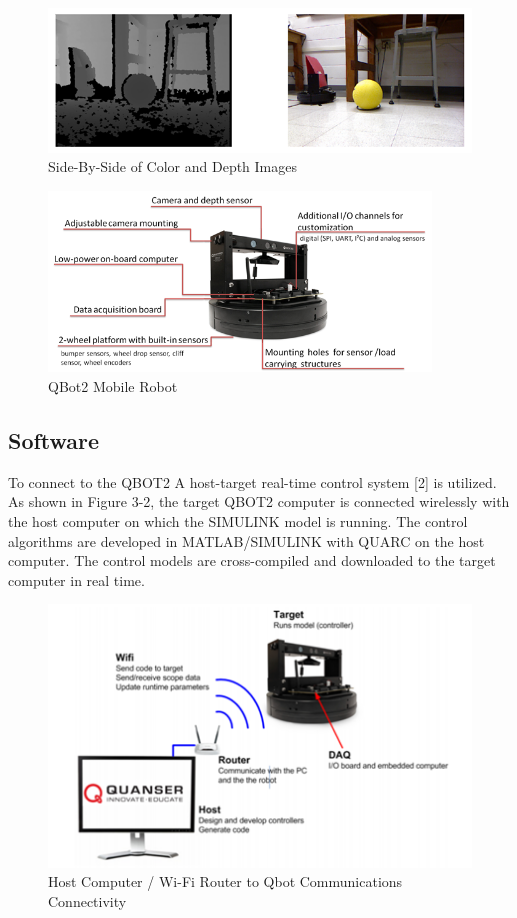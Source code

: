 \begin{figure}[htbp] %
     \centering
     \includegraphics[width=5in]{1.png} 
     \caption{Side-By-Side of Color and Depth Images}
     \label{fig:1}
  \end{figure}     


\begin{figure}[htbp] %
     \centering
     \includegraphics[width=4in]{2.png} 
     \caption{QBot2 Mobile Robot}
     \label{fig:2}
  \end{figure}     


\subsection{Software}
To connect to the QBOT2 A host-target real-time control system [2] is utilized.   As shown in Figure 3-2, the target QBOT2 computer is connected wirelessly with the host computer on which the SIMULINK model is running. The control algorithms are developed in MATLAB/SIMULINK with QUARC on the host computer. The control models are cross-compiled and downloaded to the target computer in real time. 


\begin{figure}[htbp]
\begin{center}
\includegraphics[width=5in]{3}
\caption{Host Computer / Wi-Fi Router to Qbot Communications Connectivity} \label{fig:3}
\end{center}
\end{figure}

